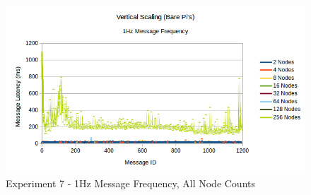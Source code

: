 \documentclass[../dissertation.tex]{subfiles}
\begin{document}
\begin{figure}[H]
\centering
\includegraphics[width=\textwidth]{images/experiment8/vertical_scaling_1hz_all_node_counts.png}
\caption{Experiment 7 - 1Hz Message Frequency, All Node Counts}
\label{exp7-further-1hz-all-nodes}
\end{figure}
\end{document}
